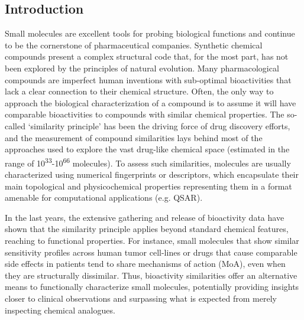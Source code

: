 \subsection{Introduction}

Small molecules are excellent tools for probing biological functions and continue to be the cornerstone of pharmaceutical companies. Synthetic chemical compounds present a complex structural code that, for the most part, has not been explored by the principles of natural evolution. Many pharmacological compounds are imperfect human inventions with sub-optimal bioactivities that lack a clear connection to their chemical structure. Often, the only way to approach the biological characterization of a compound is to assume it will have comparable bioactivities to compounds with similar chemical properties. The so-called ‘similarity principle’ has been the driving force of drug discovery efforts\cite{kumar_advances_2018}, and the measurement of compound similarities lays behind most of the approaches used to explore the vast drug-like chemical space (estimated in the range of 10\textsuperscript{33}-10\textsuperscript{66} molecules\cite{polishchuk_estimation_2013, bohacek_art_1996}). To assess such similarities, molecules are usually characterized using numerical fingerprints or descriptors\cite{cereto-massague_molecular_2015}, which encapsulate their main topological and physicochemical properties representing them in a format amenable for computational applications (e.g. QSAR\cite{yang_concepts_2022}).

In the last years, the extensive gathering and release of bioactivity data have shown that the similarity principle applies beyond standard chemical features, reaching to functional properties. For instance, small molecules that show similar sensitivity profiles across human tumor cell-lines or drugs that cause comparable side effects in patients tend to share mechanisms of action (MoA), even when they are structurally dissimilar\cite{holbeck_analysis_2010, seashore-ludlow_harnessing_2015, campillos_drug_2008}. Thus, bioactivity similarities offer an alternative means to functionally characterize small molecules, potentially providing insights closer to clinical observations and surpassing what is expected from merely inspecting chemical analogues\cite{petrone_rethinking_2012}.




